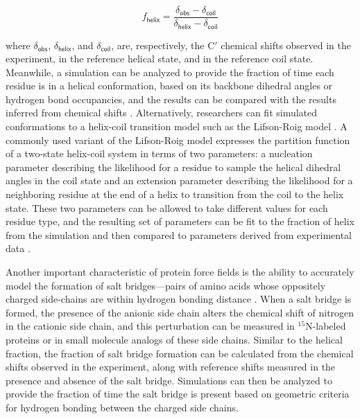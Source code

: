 \documentclass[9pt,review]{livecoms}
\begin{document}
\begin{equation}
\label{eqn:fraction_helix}
f_{\mathsf{helix}} = \frac {\delta_{\mathsf{obs}} - \delta_{\mathsf{coil}}} {\delta_{\mathsf{helix}} - \delta_{\mathsf{coil}}}
\end{equation}

\noindent where $\delta_{\mathsf{obs}}$,  $\delta_{\mathsf{helix}}$, and $\delta_{\mathsf{coil}}$, are, respectively, the C$'$ chemical shifts observed in the experiment, in the reference helical state, and in the reference coil state.
Meanwhile, a simulation can be analyzed to provide the fraction of time each residue is in a helical conformation, based on its backbone dihedral angles or hydrogen bond occupancies, and the results can be compared with the results inferred from chemical shifts \cite{best_optimized_2009}.
Alternatively, researchers can fit simulated conformations to a helix-coil transition model such as the Lifson-Roig model \cite{lifson_theory_1961}.
A commonly used variant of the Lifson-Roig model expresses the partition function of a two-state helix-coil system in terms of two parameters: a nucleation parameter describing the likelihood for a residue to sample the helical dihedral angles in the coil state and an extension parameter describing the likelihood for a neighboring residue at the end of a helix to transition from the coil to the helix state.
These two parameters can be allowed to take different values for each residue type, and the resulting set of parameters can be fit to the fraction of helix from the simulation and then compared to parameters derived from experimental data \cite{best_optimized_2009}.

Another important characteristic of protein force fields is the ability to accurately model the formation of salt bridges---pairs of amino acids whose oppositely charged side-chains are within hydrogen bonding distance \cite{donald_salt_2011}.
When a salt bridge is formed, the presence of the anionic side chain alters the chemical shift of nitrogen in the cationic side chain, and this perturbation can be measured in $^{15}$N-labeled proteins \cite{tomlinson2009characterization} or in small molecule analogs of these side chains.
Similar to the helical fraction, the fraction of salt bridge formation can be calculated from the chemical shifts observed in the experiment, along with reference shifts measured in the presence and absence of the salt bridge.
Simulations can then be analyzed to provide the fraction of time the salt bridge is present based on geometric criteria for hydrogen bonding between the charged side chains.
\end{document}
